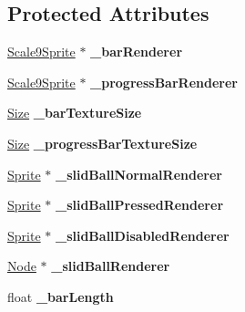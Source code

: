 \subsection*{Protected Attributes}
\begin{DoxyCompactItemize}
\item 
\mbox{\label{classui_1_1Slider_a3fecbe427ce9fc54d30c88d459723b67}} 
\hyperlink{classui_1_1Scale9Sprite}{Scale9\+Sprite} $\ast$ {\bfseries \+\_\+bar\+Renderer}
\item 
\mbox{\label{classui_1_1Slider_ac3b50c4b6c471b01c1abae245036dc79}} 
\hyperlink{classui_1_1Scale9Sprite}{Scale9\+Sprite} $\ast$ {\bfseries \+\_\+progress\+Bar\+Renderer}
\item 
\mbox{\label{classui_1_1Slider_a11436338b1aaccbd03c379b6a6b71d3d}} 
\hyperlink{classSize}{Size} {\bfseries \+\_\+bar\+Texture\+Size}
\item 
\mbox{\label{classui_1_1Slider_ac7a00420262c685461e2f7d6c34f698b}} 
\hyperlink{classSize}{Size} {\bfseries \+\_\+progress\+Bar\+Texture\+Size}
\item 
\mbox{\label{classui_1_1Slider_a8720b7c947f58c9619e4df6012d4729e}} 
\hyperlink{classSprite}{Sprite} $\ast$ {\bfseries \+\_\+slid\+Ball\+Normal\+Renderer}
\item 
\mbox{\label{classui_1_1Slider_a2a1a220d5fef8588b5c532f25b78a07a}} 
\hyperlink{classSprite}{Sprite} $\ast$ {\bfseries \+\_\+slid\+Ball\+Pressed\+Renderer}
\item 
\mbox{\label{classui_1_1Slider_aa37fc3eae45a2ec4a640d4538449ea85}} 
\hyperlink{classSprite}{Sprite} $\ast$ {\bfseries \+\_\+slid\+Ball\+Disabled\+Renderer}
\item 
\mbox{\label{classui_1_1Slider_af49cf87c727eca21176339caee09430e}} 
\hyperlink{classNode}{Node} $\ast$ {\bfseries \+\_\+slid\+Ball\+Renderer}
\item 
\mbox{\label{classui_1_1Slider_abdd5ea6116b3b4d704b26e7d55c9da45}} 
float {\bfseries \+\_\+bar\+Length}
\item 

\end{DoxyCompactItemize}
